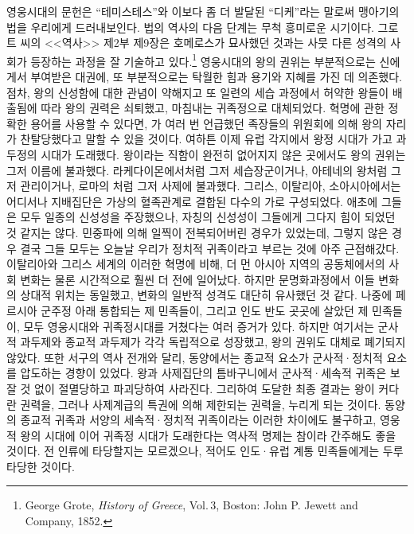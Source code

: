 영웅시대의 문헌은 ``테미스테스''와 이보다 좀 더 발달된 ``디케''라는 말로써
맹아기의 법을 우리에게 드러내보인다.
법의 역사의 다음 단계는 무척 흥미로운 시기이다.
그로트 씨의 <<역사>> 제2부 제9장은 호메로스가 묘사했던 것과는
사뭇 다른 성격의 사회가 등장하는 과정을 잘 기술하고 있다.\footnote{%
  \latinmarks
  George Grote,
  \textit{History of Greece},
  Vol.\,3,
  Boston: John P. Jewett and Company,
  1852. }
영웅시대의 왕의 권위는 부분적으로는 신에게서 부여받은 대권에,
또 부분적으로는 탁월한 힘과 용기와 지혜를 가진 데 의존했다.
점차, 왕의 신성함에 대한 관념이 약해지고 또
일련의 세습 과정에서 허약한 왕들이 배출됨에 따라
왕의 권력은 쇠퇴했고, 마침내는 귀족정으로 대체되었다.
혁명에 관한 정확한 용어를 사용할 수 있다면,
가 여러 번 언급했던 족장들의 위원회에 의해
왕의 자리가 찬탈당했다고 말할 수 있을 것이다.
여하튼 이제 유럽 각지에서 왕정 시대가 가고 과두정의 시대가 도래했다.
왕이라는 직함이 완전히 없어지지 않은 곳에서도 왕의 권위는 그저
이름에 불과했다.
라케다이몬에서처럼 그저 세습장군이거나,
아테네의  왕처럼 그저 관리이거나,
로마의 처럼
그저 사제에 불과했다.
그리스, 이탈리아, 소아시아에서는 어디서나
지배집단은 가상의 혈족관계로 결합된 다수의 가로
구성되었다.
애초에 그들은 모두 일종의 신성성을 주장했으나,
자칭의 신성성이 그들에게 그다지 힘이 되었던 것 같지는 않다.
민중파에 의해 일찍이 전복되어버린 경우가 있었는데,
그렇지 않은 경우 결국 그들 모두는
오늘날 우리가 정치적 귀족이라고 부르는 것에 아주 근접해갔다.
이탈리아와 그리스 세계의 이러한 혁명에 비해,
더 먼 아시아 지역의 공동체에서의 사회 변화는
물론 시간적으로 훨씬 더 전에 일어났다.
하지만 문명화과정에서 이들 변화의 상대적 위치는 동일했고,
변화의 일반적 성격도 대단히 유사했던 것 같다.
나중에 페르시아 군주정 아래 통합되는 제 민족들이,
그리고 인도 반도 곳곳에 살았던 제 민족들이,
모두 영웅시대와 귀족정시대를 거쳤다는 여러 증거가 있다.
하지만 여기서는 군사적 과두제와 종교적 과두제가 각각 독립적으로 성장했고,
왕의 권위도 대체로 폐기되지 않았다.
또한 서구의 역사 전개와 달리, 동양에서는
종교적 요소가 군사적^^b7정치적 요소를 압도하는 경향이 있었다.
왕과 사제집단의 틈바구니에서 군사적^^b7세속적 귀족은 보잘 것 없이
절멸당하고 파괴당하여 사라진다.
그리하여 도달한 최종 결과는
왕이 커다란 권력을, 그러나 사제계급의 특권에 의해 제한되는 권력을,
누리게 되는 것이다.
동양의 종교적 귀족과 서양의 세속적^^b7정치적 귀족이라는
이러한 차이에도 불구하고,
영웅적 왕의 시대에 이어 귀족정 시대가 도래한다는 역사적 명제는
참이라 간주해도 좋을 것이다.
전 인류에 타당할지는 모르겠으나, 적어도 인도^^b7유럽 계통 민족들에게는
두루 타당한 것이다.

